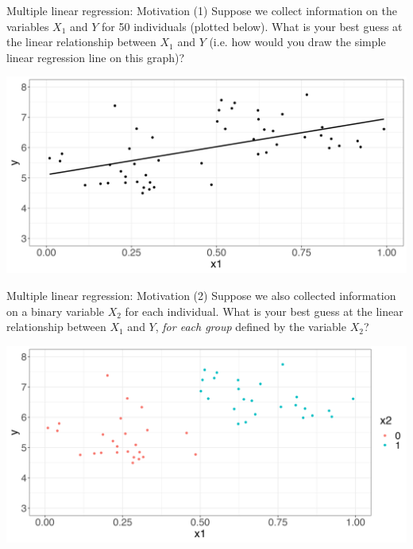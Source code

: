 \documentclass[10pt,t]{beamer}
\begin{document}
\begin{frame}{Multiple linear regression: Motivation}
(1) Suppose we collect information on the variables $X_1$ and $Y$ for 50 individuals (plotted below). What is your best guess at the linear relationship between $X_1$ and $Y$ (i.e. how would you draw the simple linear regression line on this graph)?

\vspace{0.3cm}

\centering \includegraphics[scale=0.3]{multreg2.png}
\end{frame}

\begin{frame}{Multiple linear regression: Motivation}
(2) Suppose we also collected information on a binary variable $X_2$ for each individual. What is your best guess at the linear relationship between $X_1$ and $Y$, \textit{for each group} defined by the variable $X_2$? 

\vspace{0.3cm}

\centering \includegraphics[scale=0.3]{multreg3.png}

\end{frame}
\end{document}
